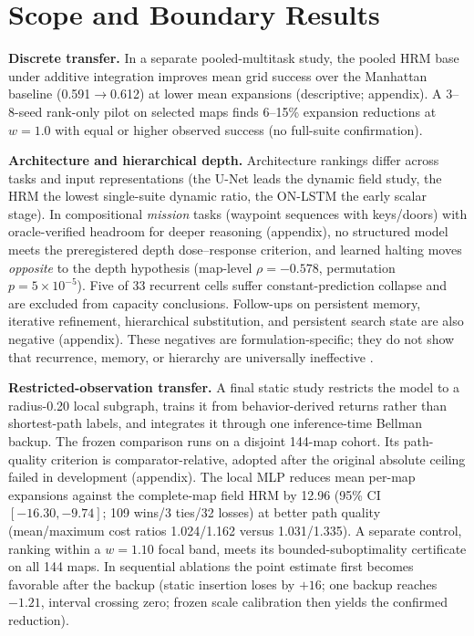 \documentclass[letterpaper]{article} %
\begin{document}
\section{Scope and Boundary Results}

\textbf{Discrete transfer.} In a separate pooled-multitask study, the pooled HRM base under additive integration improves mean grid success over the Manhattan baseline (0.591$\to$0.612) at lower mean expansions (descriptive; appendix). A 3--8-seed rank-only pilot on selected maps finds 6--15\% expansion reductions at $w{=}1.0$ with equal or higher observed success (no full-suite confirmation).

\textbf{Architecture and hierarchical depth.} Architecture rankings differ across tasks and input representations (the U-Net leads the dynamic field study, the HRM the lowest single-suite dynamic ratio, the ON-LSTM the early scalar stage). In compositional \emph{mission} tasks (waypoint sequences with keys/doors) with oracle-verified headroom for deeper reasoning (appendix), no structured model meets the preregistered depth dose--response criterion, and learned halting moves \emph{opposite} to the depth hypothesis (map-level $\rho{=}-0.578$, permutation $p{=}5\times10^{-5}$). Five of 33 recurrent cells suffer constant-prediction collapse and are excluded from capacity conclusions. Follow-ups on persistent memory, iterative refinement, hierarchical substitution, and persistent search state are also negative (appendix). These negatives are formulation-specific; they do not show that recurrence, memory, or hierarchy are universally ineffective \citep{jolicoeur2025trm,czechowski2021subgoal}.

\textbf{Restricted-observation transfer.} A final static study restricts the model to a radius-0.20 local subgraph, trains it from behavior-derived returns rather than shortest-path labels, and integrates it through one inference-time Bellman backup. The frozen comparison runs on a disjoint 144-map cohort. Its path-quality criterion is comparator-relative, adopted after the original absolute ceiling failed in development (appendix). The local MLP reduces mean per-map expansions against the complete-map field HRM by 12.96 (95\% CI $[-16.30,-9.74]$; 109 wins/3 ties/32 losses) at better path quality (mean/maximum cost ratios 1.024/1.162 versus 1.031/1.335). A separate control, ranking within a $w{=}1.10$ focal band, meets its bounded-suboptimality certificate on all 144 maps. In sequential ablations the point estimate first becomes favorable after the backup (static insertion loses by $+16$; one backup reaches $-1.21$, interval crossing zero; frozen scale calibration then yields the confirmed reduction).
\end{document}
